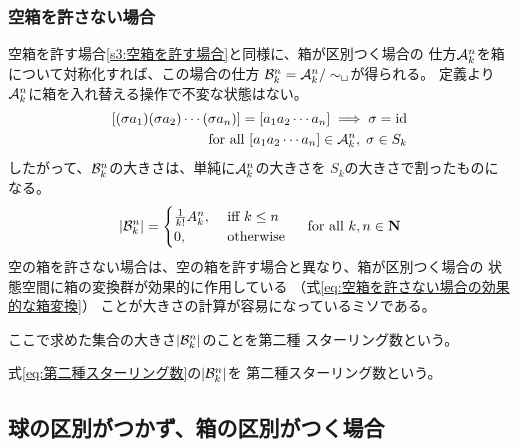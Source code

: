 \subsubsection{空箱を許さない場合}\label{s3:空箱を許さない場合} %
	空箱を許す場合\ref{s3:空箱を許す場合}と同様に、箱が区別つく場合の
	仕方${\mathcal{A}}_k^n$を箱について対称化すれば、この場合の仕方
	${\mathcal{B}}_k^n={\mathcal{A}}_k^n/\sim_\sqcup$が得られる。
	定義より${\mathcal{A}}_k^n$に箱を入れ替える操作で不変な状態はない。
	\begin{equation}\label{eq:空箱を許さない場合の効果的な箱変換}\begin{split} %
		[(\sigma a_1)(\sigma a_2)\cdots(\sigma a_n)] = [a_1a_2\cdots a_n]
			\implies \sigma = \myid \\
		\quad\text{for all }[a_1a_2\cdots a_n]\in\mycal{A}_k^n
			,\;\sigma\in S_k
	\end{split}\end{equation} %
	したがって、${\mathcal{B}}_k^n$の大きさは、単純に${\mathcal{A}}_k^n$の大きさを
	$S_k$の大きさで割ったものになる。
	\begin{equation}\label{eq:第二種スターリング数}\begin{split} %
		\zettai{\mycal{B}_k^n} = \begin{cases}
			\frac{1}{k!}A_k^n, &\text{ iff }k\le n \\
			0, &\text{ otherwise } \\
		\end{cases} \quad\text{for all }k,n\in \mybf{N}
	\end{split}\end{equation} %
	空の箱を許さない場合は、空の箱を許す場合と異なり、箱が区別つく場合の
	状態空間に箱の変換群が効果的に作用している
	（式\eqref{eq:空箱を許さない場合の効果的な箱変換}）
	ことが大きさの計算が容易になっているミソである。

	ここで求めた集合の大きさ$\left|{{\mathcal{B}}_k^n}\right|$のことを第二種
	スターリング数という。

	\begin{definition}\label{def:第二種スターリング数} %
		式\eqref{eq:第二種スターリング数}の$\left|{{\mathcal{B}}_k^n}\right|$を
		第二種スターリング数という。
	\end{definition} %
\subsection{球の区別がつかず、箱の区別がつく場合}\label{s2:球の区別がつかず、箱の区別がつく場合} %
